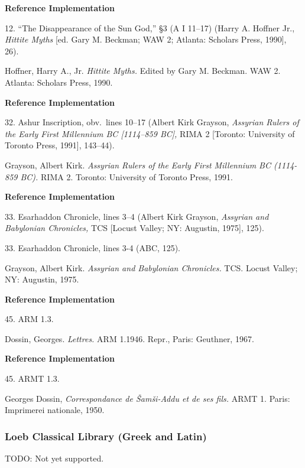 \documentclass[a4paper]{article}
\newenvironment{refimp}{%
  \begin{minipage}{\linewidth}
    \setlength{\parskip}{1ex}
    \textbf{Reference Implementation}\par
    \nobreak
    \color{reference-colour}
}{\end{minipage}}
\begin{document}
\begin{refimp}
  12. “The Disappearance of the Sun God,” §3 (A I 11–17) (Harry A. Hoffner
  Jr., \emph{Hittite Myths} [ed. Gary M. Beckman; WAW 2; Atlanta: Scholars
  Press, 1990], 26).
  
  \hangindent\bibindent Hoffner, Harry A., Jr. \emph{Hittite Myths.} Edited by
  Gary M. Beckman. WAW 2. Atlanta: Scholars Press, 1990.
\end{refimp}

\begin{refimp}
  32. Ashur Inscription, obv.\ lines 10–17 (Albert Kirk Grayson,
  \emph{Assyrian Rulers of the Early First Millennium BC [1114–859 BC],} RIMA
  2 [Toronto: University of Toronto Press, 1991], 143–44).

  \hangindent\bibindent Grayson, Albert Kirk. \emph{Assyrian Rulers of the
  Early First Millennium BC (1114-859 BC).} RIMA 2. Toronto: University of
  Toronto Press, 1991.
\end{refimp}

\begin{refimp}
  33. Esarhaddon Chronicle, lines 3–4 (Albert Kirk Grayson, \emph{Assyrian and
  Babylonian Chronicles,} TCS [Locust Valley; NY: Augustin, 1975], 125).

  33. Esarhaddon Chronicle, lines 3-4 (ABC, 125).

  \hangindent\bibindent Grayson, Albert Kirk. \emph{Assyrian and Babylonian
  Chronicles.} TCS. Locust Valley; NY: Augustin, 1975.
\end{refimp}

\begin{refimp}
  45. ARM 1.3.

  \hangindent\bibindent Dossin, Georges. \emph{Lettres.} ARM 1.1946. Repr.,
  Paris: Geuthner, 1967.
\end{refimp}

\begin{refimp}
  45. ARMT 1.3.

  \hangindent\bibindent Georges Dossin, \emph{Correspondance de Šamši-Addu et de
  ses fils.} ARMT 1. Paris: Imprimerei nationale, 1950.
\end{refimp}

\subsubsection{Loeb Classical Library (Greek and Latin)}

TODO: Not yet supported.
\end{document}

